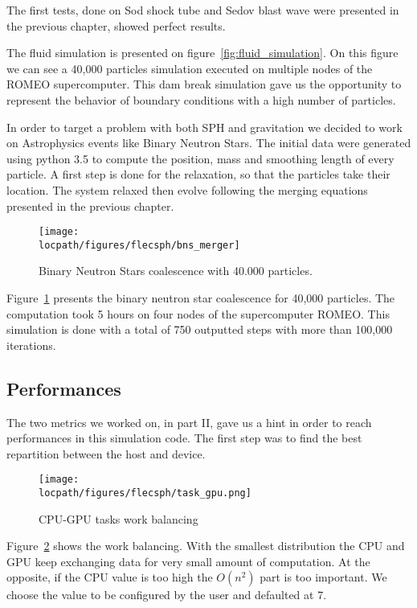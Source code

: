 The first tests, done on Sod shock tube and Sedov blast wave were presented in the previous chapter, showed perfect results. 

The fluid simulation is presented on figure~\ref{fig:fluid_simulation}.
On this figure we can see a 40,000 particles simulation executed on multiple nodes of the ROMEO supercomputer. 
This dam break simulation gave us the opportunity to represent the behavior of boundary conditions with a high number of particles. 

In order to target a problem with both SPH and gravitation we decided to work on Astrophysics events like Binary Neutron Stars.
The initial data were generated using python 3.5 to compute the position, mass and smoothing length of every particle. 
A first step is done for the relaxation, so that the particles take their location. 
The system relaxed then evolve following the merging equations presented in the previous chapter. 
\begin{figure}[t!]
\centering
\texttt{[image: \\locpath/figures/flecsph/bns\_merger]}
\caption{Binary Neutron Stars coalescence with 40.000 particles.}
\label{fig:bns_simulation}
\end{figure}

Figure~\ref{fig:bns_simulation} presents the binary neutron star coalescence for 40,000 particles. 
The computation took 5 hours on four nodes of the supercomputer ROMEO. 
This simulation is done with a total of 750 outputted steps with more than 100,000 iterations. 


\subsection{Performances}
The two metrics we worked on, in part II, gave us a hint in order to reach performances in this simulation code. 
The first step was to find the best repartition between the host and device.

\begin{figure}[t!]
\centering
\texttt{[image: \\locpath/figures/flecsph/task\_gpu.png]}
\caption{CPU-GPU tasks work balancing}
\label{fig:cpu_gpu_rep}
\end{figure}%

Figure~\ref{fig:cpu_gpu_rep} shows the work balancing. 
With the smallest distribution the CPU and GPU keep exchanging data for very small amount of computation. 
At the opposite, if the CPU value is too high the $O(n^2)$ part is too important. 
We choose the value to be configured by the user and defaulted at 7.

